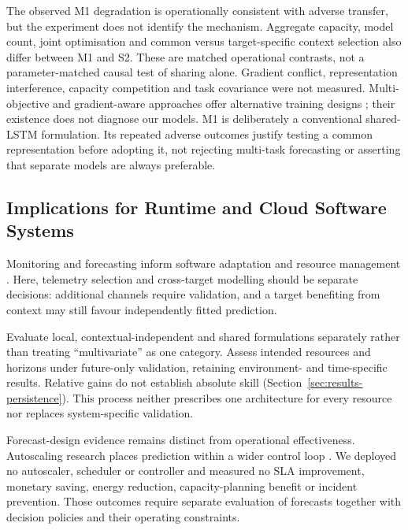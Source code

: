 \documentclass[a4paper,fleqn]{cas-dc}
\begin{document}
The observed M1 degradation is operationally consistent with adverse transfer,
but the experiment does not identify the mechanism. Aggregate capacity,
model count, joint optimisation and common versus target-specific context
selection also differ between M1 and S2. These are matched operational
contrasts, not a parameter-matched causal test of sharing alone.
Gradient conflict, representation
interference, capacity competition and task covariance were not measured.
Multi-objective and gradient-aware approaches offer alternative training
designs \citep{Sener2018MultiObjective,Yu2020GradientSurgery}; their existence
does not diagnose our models. M1 is deliberately a conventional shared-LSTM
formulation. Its repeated adverse outcomes justify testing a common
representation before adopting it, not rejecting multi-task forecasting or
asserting that separate models are always preferable.

\subsection{Implications for Runtime and Cloud Software Systems}
\label{sec:discussion-systems}

Monitoring and forecasting inform software adaptation and resource management
\citep{Taherizadeh2018Monitoring,Bauer2020SelfAware}. Here, telemetry
selection and cross-target modelling should be separate decisions: additional
channels require validation, and a target benefiting from context may still
favour independently fitted prediction.

Evaluate local, contextual-independent and shared formulations separately
rather than treating ``multivariate'' as one category. Assess intended
resources and horizons under future-only validation, retaining environment-
and time-specific results. Relative gains do not establish absolute skill
(Section~\ref{sec:results-persistence}). This process neither prescribes one
architecture for every resource nor replaces system-specific validation.

Forecast-design evidence remains distinct from operational effectiveness.
Autoscaling research places prediction within a wider control loop
\citep{Qu2018Autoscaling}. We deployed no autoscaler, scheduler or controller
and measured no SLA improvement, monetary saving, energy reduction,
capacity-planning benefit or incident prevention. Those outcomes require
separate evaluation of forecasts together with decision policies and their
operating constraints.
\end{document}
